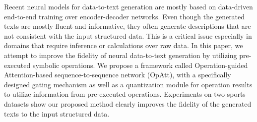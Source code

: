 Recent neural models for data-to-text generation are mostly based on data-driven end-to-end training over encoder-decoder networks. Even though the generated texts are mostly fluent and informative, they often generate descriptions that are not consistent with the input structured data. This is a critical issue especially in domains that require inference or calculations over raw data. In this paper, we attempt to improve the fidelity of neural data-to-text generation by utilizing pre-executed symbolic operations. We propose a framework called Operation-guided Attention-based sequence-to-sequence network (OpAtt), with a specifically designed gating mechanism as well as a quantization module for operation results to utilize information from pre-executed operations. Experiments on two sports datasets show our proposed method clearly improves the fidelity of the generated texts to the input structured data.
